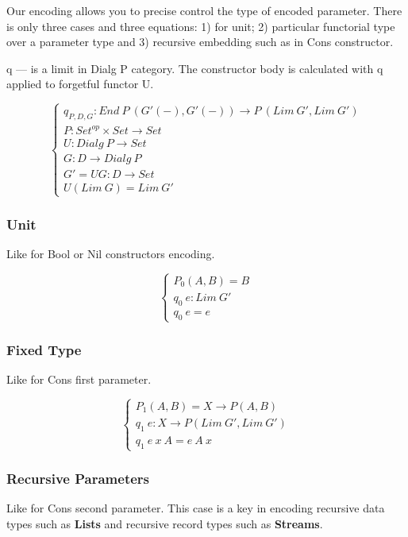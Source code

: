 \documentclass[11pt,oneside]{article}
\begin{document}
Our encoding allows you to precise control the type of encoded parameter.
There is only three cases and three equations: 1) for unit; 2) particular
functorial type over a parameter type and 3) recursive embedding such as
in Cons constructor.

q — is a limit in Dialg P category. The constructor body is calculated
with q applied to forgetful functor U.

$$
\begin{cases}
q_{P,D,G} : End\ P\ (G'(-),G'(-)) \rightarrow P\ (Lim\ G',Lim\ G') \\
P : Set^{op} \times Set \rightarrow Set \\
U : Dialg\ P \rightarrow Set \\
G : D \rightarrow Dialg\ P \\
G' = UG : D \rightarrow Set \\
U (Lim\ G) = Lim\ G'
\end{cases}
$$

\subsubsection{Unit}

Like for Bool or Nil constructors encoding.

$$
\begin{cases}
P_0(A,B) =  B \\
q_0\ e : Lim\ G' \\
q_0\ e = e
\end{cases}
$$

\subsubsection{Fixed Type}

Like for Cons first parameter.

$$
\begin{cases}
P_1(A,B) = X \rightarrow P(A,B) \\
q_1\ e : X \rightarrow P ( Lim\ G',  Lim\ G' ) \\
q_1\ e\ x\ A = e\ A\ x
\end{cases}
$$

\subsubsection{Recursive Parameters}

Like for Cons second parameter. This case is a key in encoding recursive
   data types such as {\bf Lists} and recursive record types such as {\bf Streams}.
\end{document}
